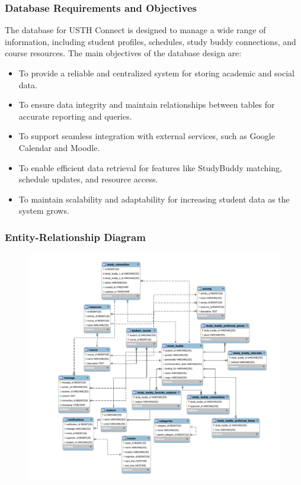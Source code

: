\documentclass[12pt]{article}
\begin{document}
\subsubsection{Database Requirements and Objectives}  
The database for USTH Connect is designed to manage a wide range of information, including student profiles, schedules, study buddy connections, and course resources. The main objectives of the database design are:  
\begin{itemize}  
    \item To provide a reliable and centralized system for storing academic and social data.  
    \item To ensure data integrity and maintain relationships between tables for accurate reporting and queries.  
    \item To support seamless integration with external services, such as Google Calendar and Moodle.  
    \item To enable efficient data retrieval for features like StudyBuddy matching, schedule updates, and resource access.  
    \item To maintain scalability and adaptability for increasing student data as the system grows.  
\end{itemize} 

\subsubsection{Entity-Relationship Diagram}
\begin{figure}[H]
    \centering
    \includegraphics[width=\paperwidth,height=\paperheight,keepaspectratio]{image/USTH-Connect-Database-Schema-v1-cropped.pdf}
\end{figure}
\restoregeometry
\end{document}
